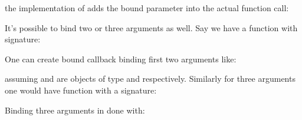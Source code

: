 \documentclass[letterpaper,10pt,english]{sphinxmanual}
\renewcommand{\sphinxcode}[1]{\texttt{\small{#1}}}
\begin{document}
the implementation of \sphinxcode{} adds the bound parameter into the actual
function call:

\begin{sphinxVerbatim}[commandchars=\\\{\}]
 
\end{sphinxVerbatim}

It’s possible to bind two or three arguments as well.  Say we have a function with
signature:

\begin{sphinxVerbatim}[commandchars=\\\{\}]
        
\end{sphinxVerbatim}

One can create bound callback binding first two arguments like:

\begin{sphinxVerbatim}[commandchars=\\\{\}]
   
\end{sphinxVerbatim}

assuming  and  are objects of type  and  respectively.  Similarly for
three arguments one would have function with a signature:

\begin{sphinxVerbatim}[commandchars=\\\{\}]
        
\end{sphinxVerbatim}

Binding three arguments in done with:

\begin{sphinxVerbatim}[commandchars=\\\{\}]
    
\end{sphinxVerbatim}
\end{document}

